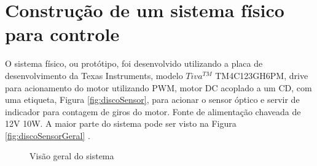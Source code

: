 


\section{ Construção de um sistema físico para controle }

 O sistema físico, ou protótipo, foi desenvolvido utilizando a placa de desenvolvimento da Texas Instruments, modelo $Tiva^{TM}$ TM4C123GH6PM, drive para acionamento do motor utilizando PWM, motor DC acoplado a um CD, com uma etiqueta, Figura \ref{fig:discoSensor}, para acionar o sensor óptico e servir de indicador para contagem de giros do motor. Fonte de alimentação chaveada de 12V 10W. A maior parte do sistema pode ser visto na Figura \ref{fig:discoSensorGeral} .



\begin{figure}[!htb]
\center
\caption{Visão geral do sistema }

\end{figure}


